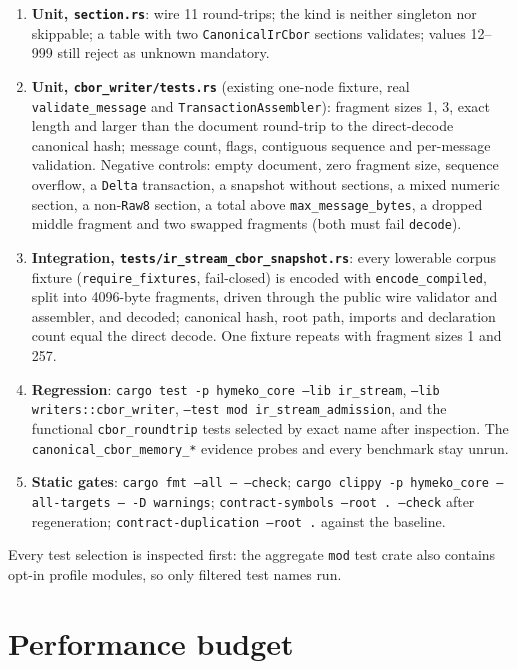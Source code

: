 \documentclass[11pt,a4paper]{article}
\begin{document}
\begin{enumerate}
\item \textbf{Unit, \texttt{section.rs}}: wire 11 round-trips; the kind is neither singleton nor skippable; a table
with two \texttt{CanonicalIrCbor} sections validates; values 12--999 still reject as unknown mandatory.
\item \textbf{Unit, \texttt{cbor\_writer/tests.rs}} (existing one-node fixture, real \texttt{validate\_message} and
\texttt{TransactionAssembler}): fragment sizes 1, 3, exact length and larger than the document round-trip to the
direct-decode canonical hash; message count, flags, contiguous sequence and per-message validation. Negative controls:
empty document, zero fragment size, sequence overflow, a \texttt{Delta} transaction, a snapshot without sections, a
mixed numeric section, a non-\texttt{Raw8} section, a total above \texttt{max\_message\_bytes}, a dropped middle
fragment and two swapped fragments (both must fail \texttt{decode}).
\item \textbf{Integration, \texttt{tests/ir\_stream\_cbor\_snapshot.rs}}: every lowerable corpus fixture
(\texttt{require\_fixtures}, fail-closed) is encoded with \texttt{encode\_compiled}, split into 4096-byte fragments,
driven through the public wire validator and assembler, and decoded; canonical hash, root path, imports and declaration
count equal the direct decode. One fixture repeats with fragment sizes 1 and 257.
\item \textbf{Regression}: \texttt{cargo test -p hymeko\_core --lib ir\_stream}, \texttt{--lib writers::cbor\_writer},
\texttt{--test mod ir\_stream\_admission}, and the functional \texttt{cbor\_roundtrip} tests selected by exact name
after inspection. The \texttt{canonical\_cbor\_memory\_*} evidence probes and every benchmark stay unrun.
\item \textbf{Static gates}: \texttt{cargo fmt --all -- --check}; \texttt{cargo clippy -p hymeko\_core --all-targets --
-D warnings}; \texttt{contract-symbols --root . --check} after regeneration; \texttt{contract-duplication --root .}
against the baseline.
\end{enumerate}

Every test selection is inspected first: the aggregate \texttt{mod} test crate also contains opt-in profile modules,
so only filtered test names run.

\section{Performance budget}
\end{document}
